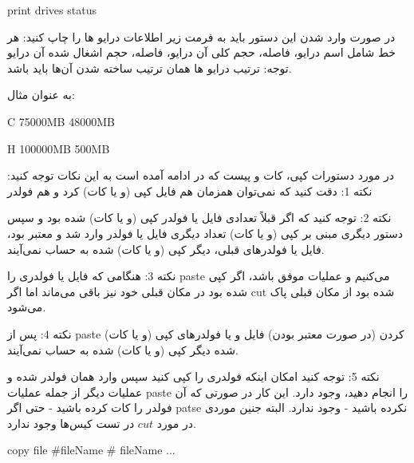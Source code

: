 \documentclass[]{article}
\begin{document}
\begin{tcolorbox}[boxrule=0pt]
	\begin{latin}
  	  \large{
  	print drives status
		}
	\end{latin}
\end{tcolorbox}

در صورت وارد شدن این دستور باید به فرمت زیر اطلاعات درایو ها را چاپ کنید:
هر خط شامل اسم درایو، فاصله، حجم کلی آن درایو، فاصله، حجم اشغال شده آن درایو
توجه: ترتیب درایو ها همان ترتیب ساخته شدن آن‌ها باید باشد.


به عنوان مثال:

\begin{tcolorbox}[boxrule=0pt]
	\begin{latin}
  	  \large{
  	C 75000MB 48000MB
  	
H 100000MB 500MB

		}
	\end{latin}
\end{tcolorbox}



در مورد دستورات کپی، کات و پیست که در ادامه آمده است به این نکات توجه کنید:
نکته 1: دقت کنید که نمی‌توان همزمان هم فایل کپی (و یا کات) کرد و هم فولدر

نکته 2: توجه کنید که اگر قبلاً تعدادی فایل یا فولدر کپی (و یا کات) شده بود و سپس دستور دیگری مبنی بر کپی (و یا کات) تعداد دیگری فایل یا فولدر وارد شد و معتبر بود، فایل یا فولدرهای قبلی، دیگر کپی (و یا کات) شده به حساب نمی‌آیند.

نکته 3: هنگامی که فایل یا فولدری را paste می‌کنیم و عملیات موفق باشد، اگر کپی شده بود در مکان قبلی خود نیز باقی می‌ماند اما اگر cut شده بود از مکان قبلی پاک می‌شود.

نکته 4: پس از paste کردن (در صورت معتبر بودن) فایل و یا فولدرهای کپی (و یا کات) شده دیگر کپی (و یا کات) شده به حساب نمی‌آیند.

نکته 5: توجه کنید امکان اینکه فولدری را کپی کنید سپس وارد همان فولدر شده و عملیات دیگر از جمله عملیات paste را انجام دهید، وجود دارد. این کار در صورتی که آن فولدر را کات کرده باشید - حتی اگر patse نکرده باشید - وجود ندارد. البته جنین موردی در مورد $cut$ در تست کیس‌ها وجود ندارد.

\begin{tcolorbox}[boxrule=0pt]
	\begin{latin}
  	  \large{
copy file \#fileName \# fileName ...

		}
	\end{latin}
\end{tcolorbox}
\end{document}
